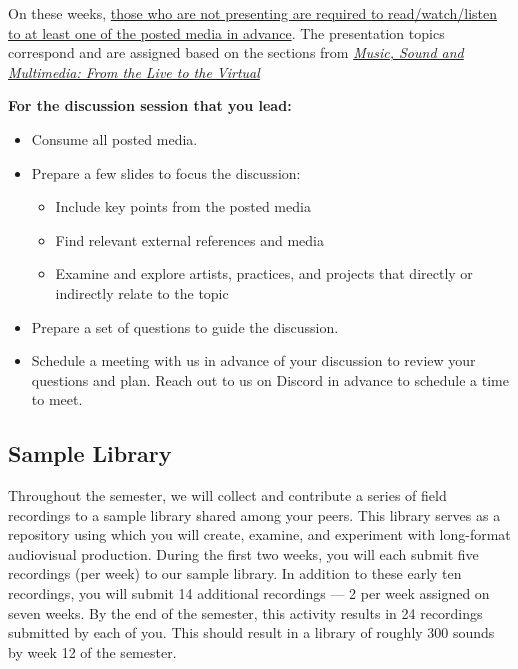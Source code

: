 On these weeks, \ul{those who are not presenting are required to read/watch/listen to at least one of the posted media in advance}. The presentation topics correspond and are assigned based on the sections from \emph{\href{supplements/Music_Sound_and_Multimedia_-_From_the_Live_to_the_Virtual_(Music_and_the_Moving_Image)_(2008).pdf}{Music, Sound and Multimedia: From the Live to the Virtual}}

\textbf{For the discussion session that you lead:}
\begin{itemize}
      \tightlist
      \item Consume all posted media.
      \item Prepare a few slides to focus the discussion:
            \begin{itemize}
                  \item Include key points from the posted media
                  \item Find relevant external references and media
                  \item Examine and explore artists, practices, and projects that directly or indirectly relate to the topic
            \end{itemize}
      \item Prepare a set of questions to guide the discussion.
      \item Schedule a meeting with us in advance of your discussion to review your questions and plan. Reach out to us on Discord in advance to schedule a time to meet.
\end{itemize}

\subsection{Sample Library}

Throughout the semester, we will collect and contribute a series of field recordings to a sample library shared among your peers. This library serves as a repository using which you will create, examine, and experiment with long-format audiovisual production. During the first two weeks, you will each submit five recordings (per week) to our sample library. In addition to these early ten recordings, you will submit 14 additional recordings --- 2 per week assigned on seven weeks. By the end of the semester, this activity results in 24 recordings submitted by each of you. This should result in a library of roughly 300 sounds by week 12 of the semester.

